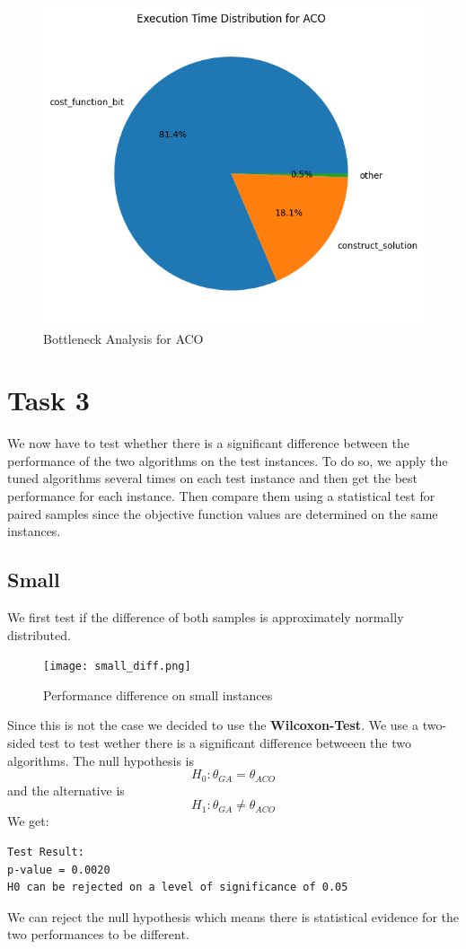 \documentclass{article}
\begin{document}
\begin{figure}[H]
    \centering
    \includegraphics[width=0.5\linewidth]{aco_bottleneck.png}
    \caption{Bottleneck Analysis for ACO}
    \label{fig:aco_bottleneck}
\end{figure}

\section{Task 3}

We now have to test whether there is a significant difference between the performance of the two algorithms on the test instances. To do so, we apply the tuned algorithms several times on each test instance and then get the best performance for each instance. Then compare them using a statistical test for paired samples since the objective function values are determined on the same instances. 
\subsection{Small}
We first test if the difference of both samples is approximately normally distributed.
\begin{figure}[H]
    \centering
    \texttt{[image: small\_diff.png]}
    \caption{Performance difference on small instances}
    \label{fig:enter-label}
\end{figure}
 Since this is not the case we decided to use the \textbf{Wilcoxon-Test}.  We use a two-sided test to test wether there is a significant difference betweeen the two algorithms. The null hypothesis is $$
 H_0 : \theta_{GA} = \theta_{ACO} $$
 and the alternative is
 $$
 H_1 : \theta_{GA} \neq \theta_{ACO}
 $$
 We get: 
 \begin{verbatim}
Test Result: 
p-value = 0.0020 
H0 can be rejected on a level of significance of 0.05 
 \end{verbatim}
 We can reject the null hypothesis which means there is statistical evidence for the two performances to be different.
\end{document}
